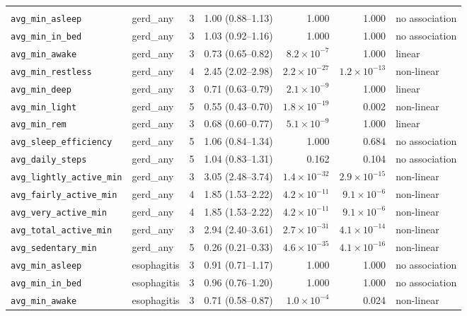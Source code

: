\documentclass[11pt]{article}
\newcommand{\code}[1]{\texttt{\small #1}}
\begin{document}
\begin{longtable}{@{}p{3.3cm}p{1.7cm}c p{2.1cm} r r p{1.6cm}@{}}
\addlinespace
\multicolumn{7}{@{}l@{}}{\itshape Combined cohort --- 28 fits, EPV 5.5--22.7} \\
\code{avg\_min\_asleep} & gerd\_any & 3 & 1.00 (0.88--1.13) & 1.000 & 1.000 & no association \\
\code{avg\_min\_in\_bed} & gerd\_any & 3 & 1.03 (0.92--1.16) & 1.000 & 1.000 & no association \\
\code{avg\_min\_awake} & gerd\_any & 3 & 0.73 (0.65--0.82) & $8.2\times10^{-7}$ & 1.000 & linear \\
\code{avg\_min\_restless} & gerd\_any & 4 & 2.45 (2.02--2.98) & $2.2\times10^{-27}$ & $1.2\times10^{-13}$ & non-linear \\
\code{avg\_min\_deep} & gerd\_any & 3 & 0.71 (0.63--0.79) & $2.1\times10^{-9}$ & 1.000 & linear \\
\code{avg\_min\_light} & gerd\_any & 5 & 0.55 (0.43--0.70) & $1.8\times10^{-19}$ & 0.002 & non-linear \\
\code{avg\_min\_rem} & gerd\_any & 3 & 0.68 (0.60--0.77) & $5.1\times10^{-9}$ & 1.000 & linear \\
\code{avg\_sleep\_efficiency} & gerd\_any & 5 & 1.06 (0.84--1.34) & 1.000 & 0.684 & no association \\
\code{avg\_daily\_steps} & gerd\_any & 5 & 1.04 (0.83--1.31) & 0.162 & 0.104 & no association \\
\code{avg\_lightly\_active\_min} & gerd\_any & 3 & 3.05 (2.48--3.74) & $1.4\times10^{-32}$ & $2.9\times10^{-15}$ & non-linear \\
\code{avg\_fairly\_active\_min} & gerd\_any & 4 & 1.85 (1.53--2.22) & $4.2\times10^{-11}$ & $9.1\times10^{-6}$ & non-linear \\
\code{avg\_very\_active\_min} & gerd\_any & 4 & 1.85 (1.53--2.22) & $4.2\times10^{-11}$ & $9.1\times10^{-6}$ & non-linear \\
\code{avg\_total\_active\_min} & gerd\_any & 3 & 2.94 (2.40--3.61) & $2.7\times10^{-31}$ & $4.1\times10^{-14}$ & non-linear \\
\code{avg\_sedentary\_min} & gerd\_any & 5 & 0.26 (0.21--0.33) & $4.6\times10^{-35}$ & $4.1\times10^{-16}$ & non-linear \\
\code{avg\_min\_asleep} & esophagitis & 3 & 0.91 (0.71--1.17) & 1.000 & 1.000 & no association \\
\code{avg\_min\_in\_bed} & esophagitis & 3 & 0.96 (0.76--1.20) & 1.000 & 1.000 & no association \\
\code{avg\_min\_awake} & esophagitis & 3 & 0.71 (0.58--0.87) & $1.0\times10^{-4}$ & 0.024 & non-linear \\

\end{longtable}
\end{document}
